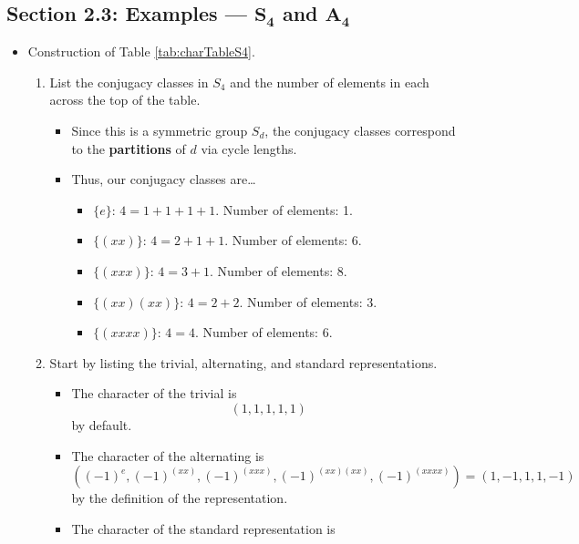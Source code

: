 \documentclass[../notes.tex]{subfiles}
\begin{document}
\subsection*{Section 2.3: Examples --- \texorpdfstring{$\bm{S_4}$}{TEXT} and \texorpdfstring{$\bm{A_4}$}{TEXT}}
\begin{itemize}
    \item Construction of Table \ref{tab:charTableS4}.
    \begin{enumerate}
        \item List the conjugacy classes in $S_4$ and the number of elements in each across the top of the table.
        \begin{itemize}
            \item Since this is a symmetric group $S_d$, the conjugacy classes correspond to the \textbf{partitions} of $d$ via cycle lengths.
            \item Thus, our conjugacy classes are\dots
            \begin{itemize}
                \item $\{e\}$: $4=1+1+1+1$. Number of elements: 1.
                \item $\{(xx)\}$: $4=2+1+1$. Number of elements: 6.
                \item $\{(xxx)\}$: $4=3+1$. Number of elements: 8.
                \item $\{(xx)(xx)\}$: $4=2+2$. Number of elements: 3.
                \item $\{(xxxx)\}$: $4=4$. Number of elements: 6.
            \end{itemize}
        \end{itemize}
        \item Start by listing the trivial, alternating, and standard representations.
        \begin{itemize}
            \item The character of the trivial is
            \begin{equation*}
                (1,1,1,1,1)
            \end{equation*}
            by default.
            \item The character of the alternating is
            \begin{equation*}
                ((-1)^e,(-1)^{(xx)},(-1)^{(xxx)},(-1)^{(xx)(xx)},(-1)^{(xxxx)}) = (1,-1,1,1,-1)
            \end{equation*}
            by the definition of the representation.
            \item The character of the standard representation is

\end{itemize}
\end{enumerate}
\end{itemize}
\end{document}
